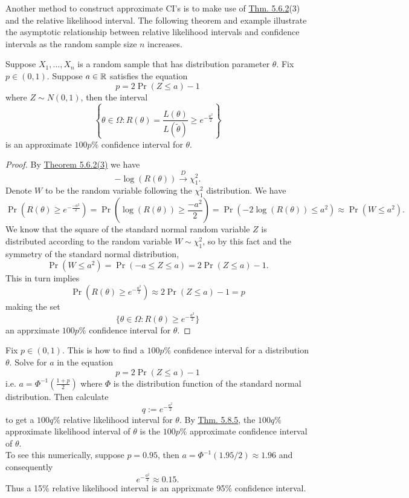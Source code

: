 \documentclass[11pt,fleqn]{book} %
\begin{document}
\begin{remark} \label{rmk:584}
Another method to construct approximate CI's is to make use of \hyperref[thm:562]{Thm. 5.6.2}(3) and the relative likelihood interval. The following theorem and example illustrate the asymptotic relationship between relative likelihood intervals and confidence intervals as the random sample size \(n\) increases.
\end{remark}

\begin{theorem} \label{thm:585}
Suppose \(X_1, \ldots, X_n\) is a random sample that has distribution parameter \(\theta\). Fix \(p \in (0, 1)\). Suppose \(a \in \mathbb{R}\) satisfies the equation
\[
p = 2\Pr(Z \leq a) - 1
\]
where \(Z \sim N(0, 1)\), then the interval
\[
\left\{\theta \in \Omega: R(\theta) = \frac{L(\theta)}{L(\tilde{\theta})} \geq e^{-\frac{a^2}{2}}\right\}
\]
is an approximate \(100p\%\) confidence interval for \(\theta\).
\end{theorem}
\begin{proof}
By \hyperref[thm:562]{Theorem 5.6.2(3)} we have
\[
-\log(R(\theta)) \xrightarrow{D} \chi^2_1.
\]
\indent Denote \(W\) to be the random variable following the \(\chi^2_1\) distribution. We have
\[
\Pr(R(\theta) \geq e^{-\frac{-a^2}{2}}) = \Pr\left(\log(R(\theta)) \geq \frac{-a^2}{2}\right) = \Pr(-2\log(R(\theta)) \leq a^2) \approx \Pr(W \leq a^2).
\]
\indent We know that the square of the standard normal random variable \(Z\) is distributed according to the random variable \(W \sim \chi^2_1\), so by this fact and the symmetry of the standard normal distribution,
\[
\Pr(W \leq a^2) = \Pr(-a \leq Z \leq a) = 2\Pr(Z \leq a) - 1.
\]
\indent This in turn implies
\[
\Pr(R(\theta) \geq e^{-\frac{a^2}{2}}) \approx 2\Pr(Z \leq a) - 1 = p
\]
making the set
\[
\{\theta \in \Omega: R(\theta) \geq e^{-\frac{a^2}{2}}\}
\]
an apprximate \(100p\%\) confidence interval for \(\theta\).
\end{proof}

\begin{example} \label{eg:586}
Fix \(p \in (0, 1)\). This is how to find a \(100p\%\) confidence interval for a distribution \(\theta\). Solve for \(a\) in the equation
\[
p = 2\Pr(Z \leq a) - 1
\]
i.e. \(a = \Phi^{-1}\left(\frac{1 + p}{2}\right)\) where \(\Phi\) is the distribution function of the standard normal distribution. Then calculate
\[
q := e^{-\frac{a^2}{2}}
\]
to get a \(100q\%\) relative likelihood interval for \(\theta\). By \hyperref[thm:585]{Thm. 5.8.5}, the \(100q\%\) approximate likelihood interval of \(\theta\) is the \(100p\%\) approximate confidence interval of \(\theta\). \\
\indent To see this numerically, suppose \(p = 0.95\), then \(a = \Phi^{-1}(1.95/2) \approx 1.96\) and consequently
\[
e^{-\frac{a^2}{2}} \approx 0.15.
\]
\indent Thus a 15\% relative likelihood interval is an apprixmate 95\% confidence interval.
\end{example}
\end{document}
